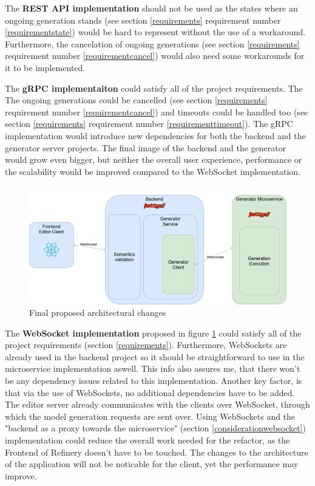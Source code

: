 	The \textbf{REST API implementation} should not be used as the states where an ongoing generation stands (see section \ref{requirements} 
	requirement number \ref{requirementstate}) would be hard to represent
	without the use of a workaround. Furthermore, the cancelation of ongoing generations (see section \ref{requirements} 
	requirement number \ref{requirementcancel}) would also need some workarounds for it to be implemented.

	The \textbf{gRPC implementaiton} could satisfy all of the project requirements. The The ongoing generations could be cancelled (see section \ref{requirements} 
	requirement number \ref{requirementcancel}) and timeouts could 
	be handled too (see section \ref{requirements} 
	requirement number \ref{requirementtimeout}). 
	The gRPC implementation would introduce new dependencies for both the backend and the generator server projects.
	The final image of the backend and the generator would grow even bigger, but neither the overall user experience, performance
	or the scalability would be improved compared to the WebSocket implementation. 

	\begin{figure}[h!]
		\begin{center}
			\includegraphics[scale=0.3]{include/imgs/arch_plan.png}
			\caption{Final proposed architectural changes}
			\label{archplan}
		\end{center}
	\end{figure}

	The \textbf{WebSocket implementation} proposed in figure \ref{archplan} could satisfy all of the project requirements (section \ref{requirements}). 
	Furthermore, WebSockets are already used 
	in the backend project so it should be straightforward to use in the microservice implementation aswell.
	This info also assures me, that there won't be any dependency issues related to this implementation. Another key factor, is that via the use of 
	WebSockets, no additional dependencies have to be added. The editor server already communicates with the clients over WebSocket, through which
	the model generation requests are sent over. Using WebSockets and the "backend as a proxy towards the microservice" (section \ref{considerationwebsocket}) implementation could 
	reduce the overall work needed for the refactor, 
	as the Frontend of Refinery 
	doesn't have to be touched. The changes to the architecture of the application will not be noticable for the client, yet the performance may improve.

